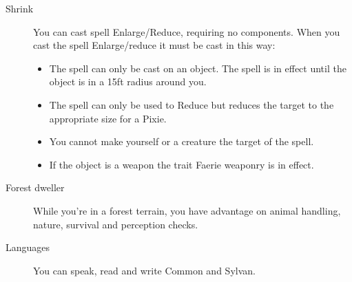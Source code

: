 \documentclass{article}
\begin{document}
\begin{description}
\item [Shrink] You can cast spell Enlarge/Reduce, requiring no components. When you cast the spell Enlarge/reduce it must be cast in this way:
\begin{itemize}
\item The spell can only be cast on an object. The spell is in effect until the object is in a 15ft radius around you.
\item The spell can only be used to Reduce but reduces the target to the appropriate size for a Pixie.
\item You cannot make yourself or a creature the target of the spell.
\item If the object is a weapon the trait Faerie weaponry is in effect.
\end{itemize}
\item [Forest dweller] While you're in a forest terrain, you have advantage on animal handling, nature, survival and perception checks.
\item [Languages] You can speak, read and write Common and Sylvan.
\end{description}
\end{document}
